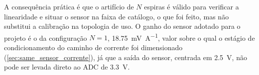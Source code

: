 A consequência prática é que o artifício de $N$ espiras é válido para verificar
a linearidade e situar o sensor na faixa de catálogo, o que foi feito,
mas não substitui a calibração na topologia de uso. O ganho do sensor adotado
para o projeto é o da configuração $N = 1$,
\SI{18,75}{\milli\volt\per\ampere}, valor sobre o qual o estágio de
condicionamento do caminho de corrente foi dimensionado
(\autoref{sec:same_sensor_corrente}), já que a saída do sensor, centrada em
\SI{2,5}{\volt}, não pode ser levada direto ao ADC de \SI{3,3}{\volt}.
